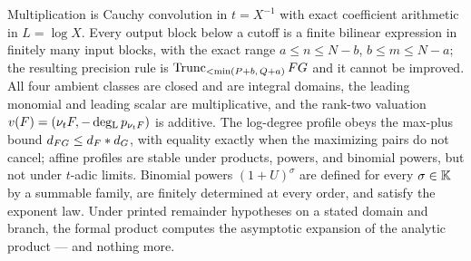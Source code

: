 \begin{summarybox}
Multiplication is Cauchy convolution in $t=X^{-1}$ with exact coefficient
arithmetic in $L=\log X$.  Every output block below a cutoff is a finite
bilinear expression in finitely many input blocks, with the exact range
$a\le n\le N-b$, $b\le m\le N-a$; the resulting precision rule is
$\Trunc{FG}{\min(P+b,\,Q+a)}$ and it cannot be improved.  All four ambient
classes are closed and are integral domains, the leading monomial and leading
scalar are multiplicative, and the rank-two valuation
$v(F)=(\ordt F,-\degL p_{\ordt F})$ is additive.  The log-degree profile
obeys the max-plus bound $\dprofile{FG}\le\dprofile{F}\ast\dprofile{G}$,
with equality exactly when the maximizing pairs do not cancel; affine
profiles are stable under products, powers, and binomial powers, but not
under $t$-adic limits.  Binomial powers $(1+U)^\sigma$ are defined for every
$\sigma\in\K$ by a summable family, are finitely determined at every order,
and satisfy the exponent law.  Under printed remainder hypotheses on a stated
domain and branch, the formal product computes the asymptotic expansion of
the analytic product --- and nothing more.
\end{summarybox}

